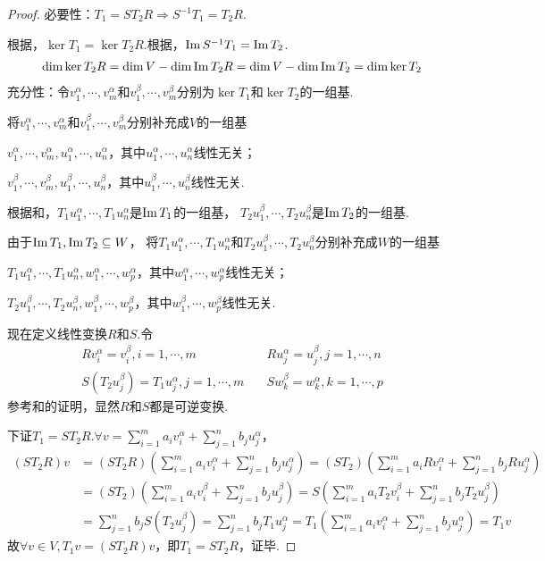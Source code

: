 \begin{proof}
    必要性：\(T_1=ST_2R \Rightarrow S^{-1}T_1=T_2R\).

    根据，\(\ker T_1=\ker T_2R\).根据，\(\operatorname{Im} S^{-1}T_1=\operatorname{Im} T_2\).
    \begin{align*}
        \dim \ker T_2R=\dim V-\dim \operatorname{Im} T_2R=\dim V-\dim \operatorname{Im} T_2=\dim \ker T_2
    \end{align*}
    充分性：令\(v_1^\alpha,\cdots,v_m^\alpha\)和\(v_1^\beta,\cdots,v_m^\beta\)分别为\(\ker T_1\)和\(\ker T_2\)的一组基.
    
    将\(v_1^\alpha,\cdots,v_m^\alpha\)和\(v_1^\beta,\cdots,v_m^\beta\)分别补充成\(V\)的一组基
    
    \(v_1^\alpha,\cdots,v_m^\alpha,u_1^\alpha,\cdots,u_n^\alpha\)，其中\(u_1^\alpha,\cdots,u_n^\alpha\)线性无关；
    
    \(v_1^\beta,\cdots,v_m^\beta,u_1^\beta,\cdots,u_n^\beta\)，其中\(u_1^\beta,\cdots,u_n^\beta\)线性无关.
    
    根据和，\(T_1u_1^\alpha,\cdots,T_1u_n^\alpha\)是\(\operatorname{Im} T_1\)的一组基，
    \(T_2u_1^\beta,\cdots,T_2u_n^\beta\)是\(\operatorname{Im} T_2\)的一组基.
    
    由于\(\operatorname{Im} T_1,\operatorname{Im} T_2 \subseteq W\)，
    将\(T_1u_1^\alpha,\cdots,T_1u_n^\alpha\)和\(T_2u_1^\beta,\cdots,T_2u_n^\beta\)分别补充成\(W\)的一组基
    
    \(T_1u_1^\alpha,\cdots,T_1u_n^\alpha,w_1^\alpha,\cdots,w_p^\alpha\)，其中\(w_1^\alpha,\cdots,w_p^\alpha\)线性无关；
    
    \(T_2u_1^\beta,\cdots,T_2u_n^\beta,w_1^\beta,\cdots,w_p^\beta\)，其中\(w_1^\beta,\cdots,w_p^\beta\)线性无关.
    
    现在定义线性变换\(R\)和\(S\).令
    \begin{align*}
        Rv_i^\alpha=v_i^\beta,i=1,\cdots,m &\quad Ru_j^\alpha=u_j^\beta,j=1,\cdots,n \\
        S(T_2u_j^\beta)=T_1u_j^\alpha,j=1,\cdots,m &\quad Sw_k^\beta=w_k^\alpha,k=1,\cdots,p
    \end{align*}
    参考和的证明，显然\(R\)和\(S\)都是可逆变换.
    
    下证\(T_1=ST_2R\).\(\forall v=\sum_{i=1}^m a_iv_i^\alpha+\sum_{j=1}^n b_ju_j^\alpha\)，
    \begin{align*}
        (ST_2R)v&=(ST_2R)(\sum_{i=1}^m a_iv_i^\alpha+\sum_{j=1}^n b_ju_j^\alpha)
                =(ST_2)(\sum_{i=1}^m a_iRv_i^\alpha+\sum_{j=1}^n b_jRu_j^\alpha) \\
                &=(ST_2)(\sum_{i=1}^m a_iv_i^\beta+\sum_{j=1}^n b_ju_j^\beta)
                =S(\sum_{i=1}^m a_iT_2v_i^\beta+\sum_{j=1}^n b_jT_2u_j^\beta) \\
                &=\sum_{j=1}^n b_jS(T_2u_j^\beta)=\sum_{j=1}^n b_jT_1u_j^\alpha
                =T_1(\sum_{i=1}^m a_iv_i^\alpha+\sum_{j=1}^n b_ju_j^\alpha)=T_1v
    \end{align*}
    故\(\forall v \in V,T_1v=(ST_2R)v\)，即\(T_1=ST_2R\)，证毕.
\end{proof}

